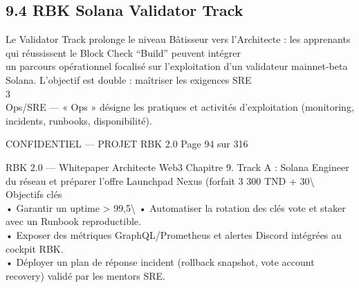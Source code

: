 \documentclass[12pt,landscape,a4paper]{article}
\newenvironment{confidential}
{\begin{tcolorbox}[
    colback=rbkred!5!white,
    colframe=rbkred!75!black,
    title=CONFIDENTIEL,
    fonttitle=\bfseries\color{white},
    coltitle=rbkred!75!black,
    breakable,
    enhanced,
    frame hidden,
    borderline west={2pt}{0pt}{rbkred!75!black}
]}
{\end{tcolorbox}}
\begin{document}
\subsection{9.4 RBK Solana Validator Track}
Le Validator Track prolonge le niveau Bâtisseur vers l’Architecte : les apprenants qui réussissent le Block Check “Build” peuvent intégrer\\
un parcours opérationnel focalisé sur l’exploitation d’un validateur mainnet-beta Solana. L’objectif est double : maîtriser les exigences SRE\\
3\\
Ops/SRE — « Ops » désigne les pratiques et activités d’exploitation (monitoring, incidents, runbooks, disponibilité).\\
\vspace{0.5em}
\vspace{0.5em}
\vspace{0.5em}
\begin{confidential}CONFIDENTIEL — PROJET RBK 2.0                                               Page 94 sur 316\end{confidential}
RBK 2.0 — Whitepaper Architecte Web3                                                                   Chapitre 9. Track A : Solana Engineer\\
\vspace{0.5em}
\vspace{0.5em}
du réseau et préparer l’offre Launchpad Nexus (forfait 3 300 TND + 30\textbackslash{}%
\vspace{0.5em}
Objectifs clés\\
\vspace{0.5em}
• Garantir un uptime \textgreater{} 99,5\textbackslash{}%
\vspace{0.5em}
• Automatiser la rotation des clés vote et staker avec un Runbook reproductible.\\
\vspace{0.5em}
• Exposer des métriques GraphQL/Prometheus et alertes Discord intégrées au cockpit RBK.\\
\vspace{0.5em}
• Déployer un plan de réponse incident (rollback snapshot, vote account recovery) validé par les mentors SRE.\\
\vspace{0.5em}
\vspace{0.5em}
\end{document}

